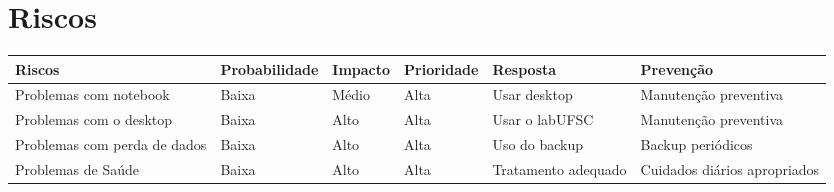 \documentclass[12pt]{article}
\begin{document}
\section{Riscos}
    \begin{tabular}{|p{2.5cm}|p{2.5cm}|p{2.5cm}|p{2.5cm}|p{2.5cm}|p{2.5cm}|}
    	\hline
    	Riscos					& Probabilidade	&	Impacto	&	Prioridade	&	Resposta				& Prevenção \\
    	\hline
    	\hline
    	Problemas com notebook		& Baixa			&	Médio	&	Alta		&   Usar desktop  & Manutenção preventiva \\
    	\hline
    	Problemas com o desktop   &   Baixa   &   Alto    & Alta    &   Usar o labUFSC  & Manutenção preventiva \\
    	\hline
    	Problemas com perda de dados				& Baixa			&	Alto	&	Alta		&	Uso do backup	& Backup periódicos\\
    	\hline
    	Problemas de Saúde		& Baixa			&	Alto	&	Alta		&	Tratamento adequado		& Cuidados diários apropriados		 \\
    	\hline
    \end{tabular}
\newpage



\end{document}
